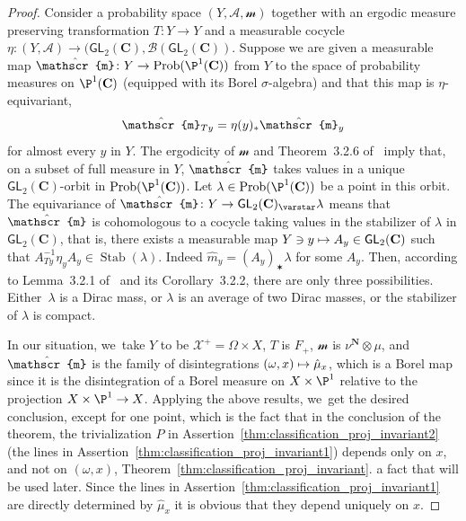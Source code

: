 \documentclass[JEP,XML,SOM,Unicode,published]{cedram}
\newcommand\mto{\mathchoice{\longmapsto}{\mapsto}{\mapsto}{\mapsto}}
\newcommand{\inv}{^{-1}}
\DeclareMathOperator{\Stab}{Stab}
\def\C{\mathbf{C}}
\def\N{\mathbf{N}}
\newcommand{\cX}{\mathcal{X}}
\newcommand\GL{{\mathsf{GL}}}
\newcommand{\m}{\mathscr{m}}
\theoremstyle{plain}
\theoremstyle{definition}
\begin{document}
\begin{proof}
Consider a probability space $(Y, \mathcal{A}, \m)$ together with an ergodic measure preserving transformation $T\colon Y\to Y$ and a measurable cocycle $\eta\colon (Y, \mathcal A)\to (\GL_2(\C), \mathcal{B}(\GL_2(\C))$. Suppose we are given a measurable map
$\hat\m\colon Y\to \mathrm{Prob}(\P^1(\C))$ from $Y$ to the space of probability measures on $\P^1(\C)$ (equipped with its Borel $\sigma$-algebra)
and that this map is $\eta$-equivariant, \ie
\begin{equation*}
\hat\m_{Ty}=\eta(y)_*\hat\m_y
\end{equation*}
for almost every $y$ in $Y$. The ergodicity of $\m$ and Theorem~3.2.6 of~\cite{Zimmer:book} imply
that, on a subset of full measure in $Y$, $\hat\m$ takes values in a unique $\GL_2(\C)$-orbit in $\mathrm{Prob}(\P^1(\C))$. Let $\lambda\in \mathrm{Prob}(\P^1(\C))$ be a point in this orbit. The equivariance of $\hat\m\colon Y\to \GL_2(\C)_\varstar\lambda$ means that $\hat\m$ is cohomologous to a cocycle taking values in the stabilizer of $\lambda$ in $\GL_2(\C)$, that is,
there exists a measurable map $Y\ni y\mto A_y\in \GL_2(\C)$ such that
$A_{Ty}\inv \eta_y A_y \in \Stab(\lambda)$. Indeed $\hat m_y = (A_y)_\varstar \lambda$ for some $A_y$.
Then, according to Lemma~3.2.1 of~\cite{Zimmer:book} and its Corollary~3.2.2, there are only three possibilities. Either~$\lambda$ is a Dirac mass, or $\lambda$ is an average of two Dirac masses, or the stabilizer of $\lambda$ is compact.

In our situation, we~take $Y$ to be $\cX^+ = \Omega\times X$, $T$ is $F_+$,
$\m$ is $\nu^\N \otimes \mu$, and $\hat \m$ is the family of disintegrations
$(\omega, x)\mto \hat \mu_x$, which is a Borel map since it is the disintegration of a Borel measure on $X\times \P^1$ relative to the projection $X\times \P^1\to X$. Applying the above results, we~get the desired conclusion, except for one point, which is the fact that in the conclusion of the theorem,
the trivialization $P$ in Assertion~\eqref{thm:classification_proj_invariant2} (\resp the lines in Assertion~\eqref{thm:classification_proj_invariant1}) depends only on $x$, and not on $(\omega,x)$, Theorem~\ref{thm:classification_proj_invariant}.
a fact that will be used later.
Since the lines in Assertion~\eqref{thm:classification_proj_invariant1} are directly determined by $\hat \mu_x$ it is obvious that they
depend uniquely on $x$.


\end{proof}
\end{document}
